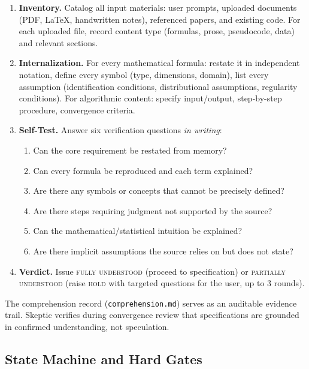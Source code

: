 \begin{enumerate}[leftmargin=*,label=\textbf{Stage \arabic*},itemsep=3pt]
\item \textbf{Inventory.} Catalog all input materials: user prompts,
  uploaded documents (PDF, \LaTeX, handwritten notes), referenced
  papers, and existing code. For each uploaded file, record content
  type (formulas, prose, pseudocode, data) and relevant sections.

\item \textbf{Internalization.} For every mathematical formula:
  restate it in independent notation, define every symbol (type,
  dimensions, domain), list every assumption (identification
  conditions, distributional assumptions, regularity conditions).
  For algorithmic content: specify input/output, step-by-step
  procedure, convergence criteria.

\item \textbf{Self-Test.} Answer six verification questions
  \emph{in writing}:
  \begin{enumerate}[label=(\alph*),itemsep=1pt]
    \item Can the core requirement be restated from memory?
    \item Can every formula be reproduced and each term explained?
    \item Are there any symbols or concepts that cannot be precisely
      defined?
    \item Are there steps requiring judgment not supported by the
      source?
    \item Can the mathematical/statistical intuition be explained?
    \item Are there implicit assumptions the source relies on but
      does not state?
  \end{enumerate}

\item \textbf{Verdict.} Issue \textsc{fully understood} (proceed to
  specification) or \textsc{partially understood} (raise
  \textsc{hold} with targeted questions for the user, up to 3
  rounds).
\end{enumerate}

The comprehension record (\texttt{comprehension.md}) serves as an
auditable evidence trail. Skeptic verifies during convergence review
that specifications are grounded in confirmed understanding, not
speculation.


\subsection{State Machine and Hard Gates}
\label{sec:state-machine}

